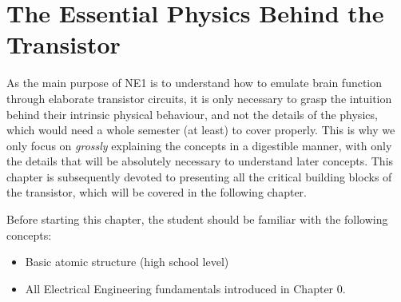\newpage
\section{The Essential Physics Behind the Transistor}\label{chapter:transistor}
 As the main purpose of NE1 is to understand how to emulate brain function through elaborate transistor circuits, it is only necessary to grasp the intuition behind their intrinsic physical behaviour, and not the details of the physics, which would need a whole semester (at least) to cover properly. This is why we only focus on \textit{grossly} explaining the concepts in a digestible manner, with only the details that will be absolutely necessary to understand later concepts. This chapter is subsequently devoted to presenting all the critical building blocks of the transistor, which will be covered in the following chapter.
 
Before starting this chapter, the student should be familiar with the following concepts: 
\begin{itemize}
    \item Basic atomic structure (high school level)
    \item All Electrical Engineering fundamentals introduced in Chapter 0. 
\end{itemize}









